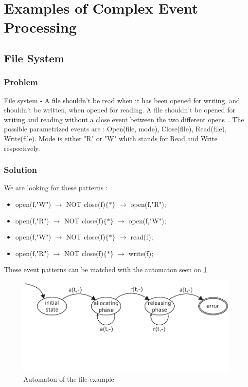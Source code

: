 	\section{Examples of Complex Event Processing}
 
 
		\subsection{File System}
			\subsubsection{Problem}
				File system - A file shouldn't be read when it has been opened for writing, and shouldn't be written, when opened for reading. 
				A file shouldn't be opened for writing and reading without a close event between the two different opens~\citep{marq}.
				The possible parametrized events are : 
				Open(file, mode), 
				Close(file), 
				Read(file), 
				Write(file). 
				Mode is either "R" or "W" which stands for Read and Write respectively.
			\subsubsection{Solution}
				We are looking for these patterns :

				\begin{itemize}
					\item open(f,"W") $\rightarrow$ NOT close(f)$\{\ast\}$ $\rightarrow$ open(f,"R");
					\item open(f,"R") $\rightarrow$ NOT close(f)$\{\ast\}$ $\rightarrow$ open(f,"W");
					\item open(f,"W") $\rightarrow$ NOT close(f)$\{\ast\}$ $\rightarrow$ read(f);
					\item open(f,"R") $\rightarrow$ NOT close(f)$\{\ast\}$ $\rightarrow$ write(f);
				\end{itemize}

				These event patterns can be matched with the automaton seen on \cref{fig:cep:ptea}
				
				\begin{figure}[h]
				\centering
				\includegraphics[width=0.7\linewidth]{include/figures/chapter_5/illustration_3}
				\caption{Automaton of the file example}
				\label{fig:cep:ptea}
				\end{figure}

